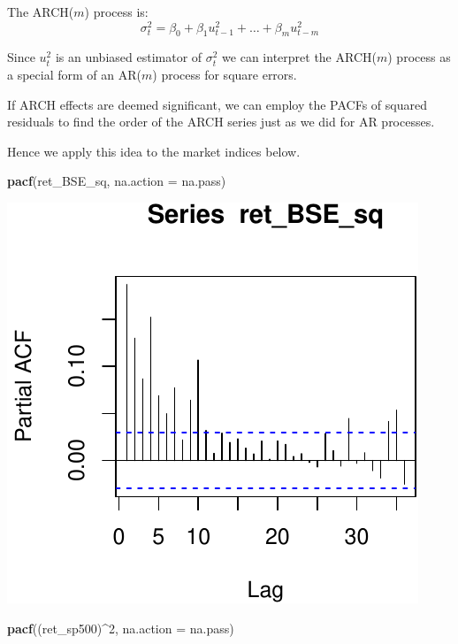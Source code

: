 \documentclass[11pt,]{article}
\newenvironment{Shaded}{\begin{snugshade}}{\end{snugshade}}
\newcommand{\KeywordTok}[1]{\textcolor[rgb]{0.13,0.29,0.53}{\textbf{#1}}}
\newcommand{\DataTypeTok}[1]{\textcolor[rgb]{0.13,0.29,0.53}{#1}}
\newcommand{\DecValTok}[1]{\textcolor[rgb]{0.00,0.00,0.81}{#1}}
\newcommand{\OperatorTok}[1]{\textcolor[rgb]{0.81,0.36,0.00}{\textbf{#1}}}
\newcommand{\NormalTok}[1]{#1}
\begin{document}
The ARCH(\(m\)) process is:
\[\sigma_t^2 = \beta_0+\beta_1u_{t-1}^2+\hdots+\beta_mu_{t-m}^2\]

Since \(u_t^2\) is an unbiased estimator of \(\sigma_t^2\) we can
interpret the ARCH(\(m\)) process as a special form of an AR(\(m\))
process for square errors.

If ARCH effects are deemed significant, we can employ the PACFs of
squared residuals to find the order of the ARCH series just as we did
for AR processes.

Hence we apply this idea to the market indices below.

\begin{Shaded}
\begin{Highlighting}[]
\KeywordTok{pacf}\NormalTok{(ret_BSE_sq, }\DataTypeTok{na.action =}\NormalTok{ na.pass)}
\end{Highlighting}
\end{Shaded}

\begin{center}\includegraphics{FMC_T4_PhD_ARMA_GARCH_files/figure-latex/ARCH_order-1} \end{center}

\begin{Shaded}
\begin{Highlighting}[]
\KeywordTok{pacf}\NormalTok{((ret_sp500)}\OperatorTok{^}\DecValTok{2}\NormalTok{, }\DataTypeTok{na.action =}\NormalTok{ na.pass)}
\end{Highlighting}
\end{Shaded}
\end{document}
